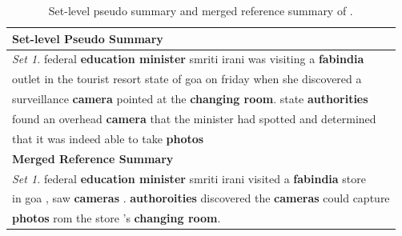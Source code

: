 \begin{table}[th]
\begin{center}
\scriptsize
\begin{tabular}{|l|}%
\hline \bf Set-level Pseudo Summary\\
\hline \textit{Set 1.} federal \textbf{education minister} smriti irani was visiting a \textbf{fabindia}\\
       outlet in the tourist resort state of goa on friday when she discovered a \\
	   surveillance \textbf{camera} pointed at the \textbf{changing room}. state \textbf{authorities} \\ 
	   found an overhead \textbf{camera} that the minister had spotted and determined \\
	   that it was indeed able to take \textbf{photos} \\
\hline \bf Merged Reference Summary \\
\hline \textit{Set 1.} federal \textbf{education minister} smriti irani visited a \textbf{fabindia} store \\
       in goa , saw \textbf{cameras} . \textbf{authoroities} discovered the \textbf{cameras} could capture \\
	   \textbf{photos} rom the store 's \textbf{changing room}. \\
\hline
\end{tabular}
\end{center}
\caption{\label{tab:data} Set-level pseudo summary and merged reference summary of .}
\end{table}

